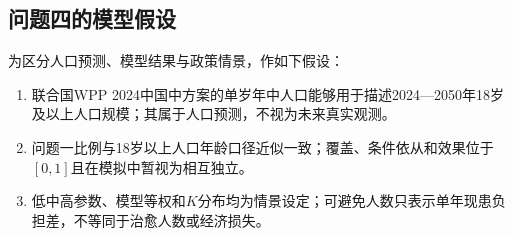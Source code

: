 \subsection{问题四的模型假设}

为区分人口预测、模型结果与政策情景，作如下假设：

\begin{enumerate}[label=(\arabic*),leftmargin=2em]
  \item 联合国WPP 2024中国中方案的单岁年中人口能够用于描述2024---2050年18岁及以上人口规模；其属于人口预测，不视为未来真实观测。
  \item 问题一比例与18岁以上人口年龄口径近似一致；覆盖、条件依从和效果位于$[0,1]$且在模拟中暂视为相互独立。
  \item 低中高参数、模型等权和$K$分布均为情景设定；可避免人数只表示单年现患负担差，不等同于治愈人数或经济损失。
\end{enumerate}

